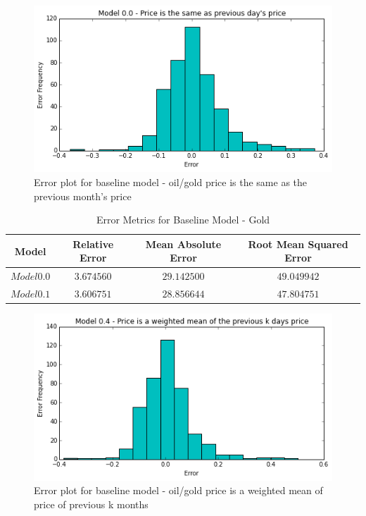 \documentclass[runningheads]{llncs}
\begin{document}
\begin{figure}
\centering
\includegraphics[width=\textwidth]{baseline1_error_histogram.png}
\caption{Error plot for baseline model - oil/gold price is the same as the previous month's price}
\label{fig:baseline1_error_histogram.png}
\end{figure}

\begin{table}
\begin{center}
\begin{tabular}{|c|c|c|c|}
\hline
Model & Relative Error & Mean Absolute Error & Root Mean Squared Error \\ \hline
$ Model 0.0 $ & $3.674560$ & $29.142500$ & $49.049942$ \\ \hline
$ Model 0.1 $ & $3.606751$ & $28.856644$ & $47.804751$\\ \hline
\end{tabular}
\end{center}
\caption{Error Metrics for Baseline Model - Gold}
\end{table}


\begin{figure}
\centering
\includegraphics[width=\textwidth]{baseline2_error_histogram.png}
\caption{Error plot for baseline model - oil/gold price is a weighted mean of price of previous k months}
\label{fig:baseline2_error_histogram.png}
\end{figure}
\end{document}
